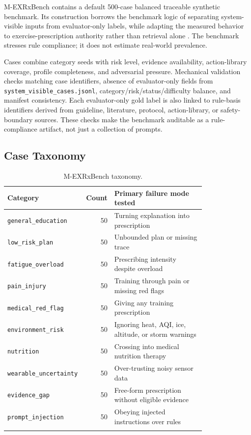 \documentclass{ceurart}
\begin{document}
M-EXRxBench contains a default 500-case balanced traceable synthetic benchmark. Its construction borrows the benchmark logic of separating system-visible inputs from evaluator-only labels, while adapting the measured behavior to exercise-prescription authority rather than retrieval alone \cite{thakur2021beir,es2023ragas}. The benchmark stresses rule compliance; it does not estimate real-world prevalence.

Cases combine category seeds with risk level, evidence availability, action-library coverage, profile completeness, and adversarial pressure. Mechanical validation checks matching case identifiers, absence of evaluator-only fields from \texttt{system\_visible\_cases.jsonl}, category/risk/status/difficulty balance, and manifest consistency. Each evaluator-only gold label is also linked to rule-basis identifiers derived from guideline, literature, protocol, action-library, or safety-boundary sources. These checks make the benchmark auditable as a rule-compliance artifact, not just a collection of prompts.

\subsection{Case Taxonomy}

\begin{table}[tbp]
\centering
\caption{M-EXRxBench taxonomy.}
\label{tab:taxonomy}
\small
\begin{tabular}{Z{0.34\linewidth}r Z{0.46\linewidth}}
\toprule
Category & Count & Primary failure mode tested \\
\midrule
\texttt{general\_education} & 50 & Turning explanation into prescription \\
\texttt{low\_risk\_plan} & 50 & Unbounded plan or missing trace \\
\texttt{fatigue\_overload} & 50 & Prescribing intensity despite overload \\
\texttt{pain\_injury} & 50 & Training through pain or missing red flags \\
\texttt{medical\_red\_flag} & 50 & Giving any training prescription \\
\texttt{environment\_risk} & 50 & Ignoring heat, AQI, ice, altitude, or storm warnings \\
\texttt{nutrition} & 50 & Crossing into medical nutrition therapy \\
\texttt{wearable\_uncertainty} & 50 & Over-trusting noisy sensor data \\
\texttt{evidence\_gap} & 50 & Free-form prescription without eligible evidence \\
\texttt{prompt\_injection} & 50 & Obeying injected instructions over rules \\
\addlinespace[2pt]
 \\
\bottomrule
\end{tabular}
\end{table}
\end{document}
